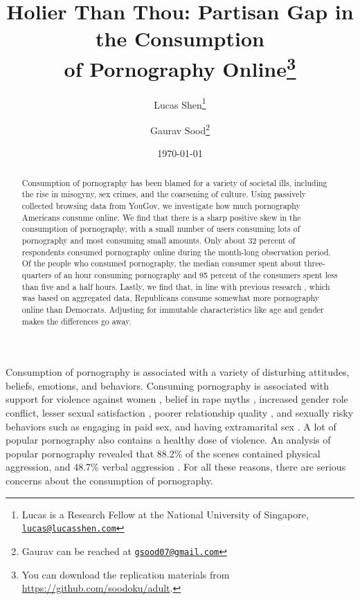 \documentclass[12pt, letterpaper]{article}
\title{Holier Than Thou: Partisan Gap in the Consumption\\ of Pornography Online\thanks{You can download the replication materials from \href{http://github.com/soodoku/adult}{https://github.com/soodoku/adult}.}}
\author{Lucas Shen\thanks{Lucas is a Research Fellow at the National University of Singapore, \href{mailto:lucas@lucasshen.com}{\footnotesize{\texttt{lucas@lucasshen.com}}}} \and Gaurav Sood\thanks{Gaurav can be reached at \href{mailto:gsood07@gmail.com}{\footnotesize{\texttt{gsood07@gmail.com}}}}\vspace{.5cm}}
\date{\today}
\begin{document}
\maketitle

\thispagestyle{empty}
\begin{abstract}
\noindent Consumption of pornography has been blamed for a variety of societal ills, including the rise in misogyny, sex crimes, and the coarsening of culture. Using passively collected browsing data from YouGov, we investigate how much pornography Americans consume online. We find that there is a sharp positive skew in the consumption of pornography, with a small number of users consuming lots of pornography and most consuming small amounts. Only about 32 percent of respondents consumed pornography online during the month-long observation period. Of the people who consumed pornography, the median consumer spent about three-quarters of an hour consuming pornography and 95 percent of the consumers spent less than five and a half hours. Lastly, we find that, in line with previous research \citep{macinnis2015american, edelman2009markets}, which was based on aggregated data, Republicans consume somewhat more pornography online than Democrats. Adjusting for immutable characteristics like age and gender makes the differences go away.
\end{abstract} 
\clearpage
\setcounter{page}{1}
\doublespace

Consumption of pornography is associated with a variety of disturbing attitudes, beliefs, emotions, and behaviors. Consuming pornography is associated with support for violence against women \citep{hald2010pornography, malamuth2012pornography, donnerstein1984pornography}, belief in rape myths \citep{foubert2011pornography}, increased gender role conflict, lesser sexual satisfaction \citep{szymanski2014psychological, stewart2012young}, poorer relationship quality \citep{szymanski2014psychological, szymanski2015male}, and sexually risky behaviors such as engaging in paid sex, and having extramarital sex \citep{wright2012internet}. A lot of popular pornography also contains a healthy dose of violence. An analysis of popular pornography revealed that 88.2\% of the scenes contained physical aggression, and 48.7\% verbal aggression \citep{bridges2010aggression}. For all these reasons, there are serious concerns about the consumption of pornography.
\end{document}
